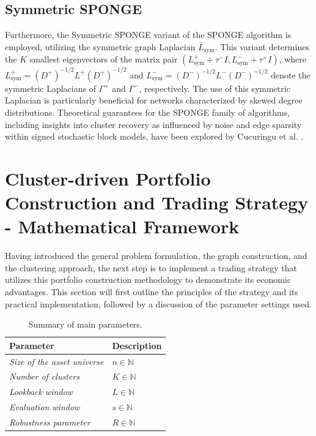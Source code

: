 \documentclass[sigconf]{acmart}
\begin{document}
\subsection{Symmetric SPONGE}
Furthermore, the Symmetric SPONGE variant of the SPONGE algorithm is employed, utilizing the symmetric graph Laplacian $\bar{L}_{\text{sym}}$. This variant determines the $K$ smallest eigenvectors of the matrix pair $(L^+_{\text{sym}} + \tau^- I, L^-_{\text{sym}} + \tau^+ I)$, where $L^+_{\text{sym}} = (D^+)^{-1/2} L^+ (D^+)^{-1/2}$ and $L^-_{\text{sym}} = (D^-)^{-1/2} L^- (D^-)^{-1/2}$ denote the symmetric Laplacians of $\Gamma^+$ and $\Gamma^-$, respectively. The use of this symmetric Laplacian is particularly beneficial for networks characterized by skewed degree distributions. Theoretical guarantees for the SPONGE family of algorithms, including insights into cluster recovery as influenced by noise and edge sparsity within signed stochastic block models, have been explored by Cucuringu et al. \cite{cucuringuSPONGE}.



\section{Cluster-driven Portfolio Construction and Trading Strategy - Mathematical Framework}
\label{trading-strat}

Having introduced the general problem formulation, the graph construction, and the clustering approach, the next step is to implement a trading strategy that utilizes this portfolio construction methodology to demonstrate its economic advantages. This section will first outline the principles of the strategy and its practical implementation, followed by a discussion of the parameter settings used. 
\vspace{5pt}
\begin{table}[h]
\centering
\begin{tabular}{ll}
\toprule
\textbf{Parameter} & \textbf{Description} \\
\midrule
\textit{Size of the asset universe} & \( n \in \mathbb{N} \) \\
\textit{Number of clusters} & \( K \in \mathbb{N} \) \\
\textit{Lookback window} & \( L \in \mathbb{N} \) \\
\textit{Evaluation window} & \( s \in \mathbb{N} \) \\
\textit{Robustness parameter} & \( R \in \mathbb{N} \) \\
\bottomrule
\end{tabular}
\caption{Summary of main parameters.}
\label{tab:parameters}
\end{table}
\end{document}
